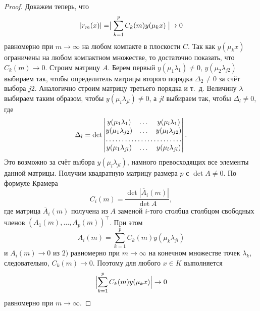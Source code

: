 \begin{proof}
Докажем теперь, что $$|r_m(x)|=\bigm |\sum\limits^{p}_{k=1}{C_k(m)y(\mu_kx)}\bigm |\to 0$$ равномерно при $m\to \infty $ на любом компакте в плоскости $C$. Так как $y(\mu_kx)$ ограничены на любом компактном множестве, то достаточно показать, что $C_k(m)\to 0$. Строим матрицу $A$. Берем первый $y(\mu_1\lambda_1)\neq 0$, $y(\mu_2\lambda_{j2})$ выбираем так, чтобы определитель матрицы второго порядка $\Delta_2 \neq 0$ за счёт выбора $j2$. Аналогично строим матрицу третьего порядка и т.~д. Величину $\lambda$ выбираем таким образом, чтобы $y(\mu_i\lambda_{jl})\neq 0$, а $jl$ выбираем так, чтобы $\Delta_l \neq 0$, где $$\Delta_l=\det 
\begin{vmatrix} y(\mu_1\lambda_1) & \dots & y(\mu_l\lambda_{1}) \\ y(\mu_1\lambda_{j2}) & \dots & y(\mu_l\lambda_{j2}) \\ \hdotsfor[1] {3} \\ y(\mu_1\lambda_{jl}) & \dots & y(\mu_l\lambda_{jl}) \end{vmatrix} .$$
 Это возможно за счёт выбора $y(\mu_l\lambda_{jl})$, намного превосходящих все элементы данной матрицы. Получим квадратную матрицу  размера $p$ с $\det A\neq 0$. 
 По формуле Крамера $$C_i(m)=\frac {\det |\overline A_i(m)|}{\det A},$$ где матрица $\overline A_i(m)$ получена из $A$ заменой $i$-того столбца столбцом свободных членов $(A_1(m),\dots, A_p(m))^\top$. 
 При этом $$A_i(m)=\sum\limits^{p}_{k=1}{C_k(m)y(\mu_k\lambda_{ji})}$$ и $A_i(m)\to 0$ из $2)$ равномерно при $m\to \infty$ на конечном множестве точек $\lambda_k$, следовательно, $C_k(m)\to 0$. Поэтому для любого $x\in K$ выполняется $$\Bigl|\sum\limits_{k=1}^p{C_k(m)y(\mu_kx)}\Bigr|\to 0$$ равномерно при $m\to \infty$. \end{proof}


